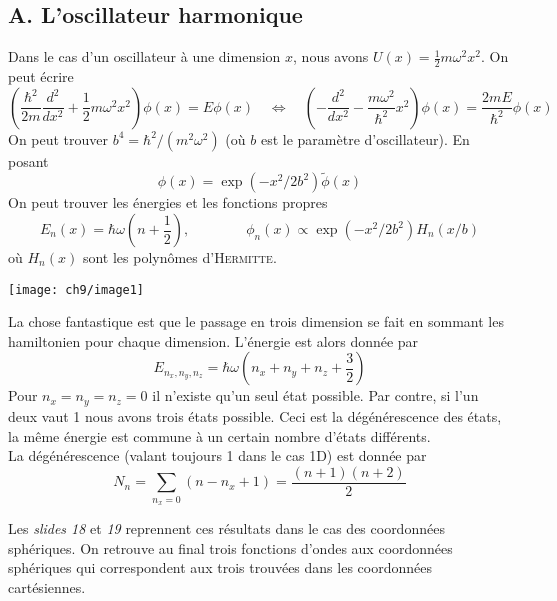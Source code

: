 \subsection{A. L'oscillateur harmonique}
Dans le cas d'un oscillateur à une dimension $x$, nous avons $U(x) = \frac{1}{2}m\omega^2x^2$. On peut écrire
\begin{equation}
\left(\frac{\hbar^2}{2m}\frac{d^2}{dx^2} + \frac{1}{2}m\omega^2x^2\right)\phi(x) = E\phi(x)\quad\Leftrightarrow
\quad \left(-\frac{d^2}{dx^2}-\frac{m\omega^2}{\hbar^2}x^2\right)\phi(x) = \frac{2mE}{\hbar^2}\phi(x)
\end{equation}
On peut trouver $b^4 = \hbar^2/(m^2\omega^2)$ (où $b$ est le paramètre d'oscillateur). En posant
\begin{equation}
\phi(x) = \exp(-x^2/2b^2)\tilde{\phi}(x)
\end{equation}
On peut trouver les énergies et les fonctions propres
\begin{equation}
E_n(x) = \hbar\omega\left(n+\frac{1}{2}\right),\qquad\qquad \phi_n(x) \propto \exp(-x^2/2b^2) H_n(x/b)
\end{equation}
où $H_n(x)$ sont les polynômes d'\textsc{Hermitte}.

\begin{center}
\texttt{[image: ch9/image1]}
\end{center}

La chose fantastique est que le passage en trois 
dimension se fait en sommant les hamiltonien pour chaque dimension. L'énergie est alors donnée par
\begin{equation}
E_{n_x,n_y,n_z} = \hbar\omega\left(n_x+n_y+n_z+\frac{3}{2}\right)
\end{equation}
Pour $n_x=n_y=n_z=0$ il n'existe qu'un seul état possible. Par contre, si l'un deux vaut 1 nous avons
trois états possible. Ceci est la dégénérescence des états, la même énergie est commune à un certain nombre
d'états différents.\\



La dégénérescence (valant toujours 1 dans le cas 1D) est donnée par
\begin{equation}
N_n = \sum_{n_x=0} (n-n_x+1) = \frac{(n+1)(n+2)}{2}
\end{equation}

Les \textit{slides 18} et \textit{19} reprennent ces résultats dans le cas des coordonnées sphériques. On retrouve
au final trois fonctions d'ondes aux coordonnées sphériques qui correspondent aux trois trouvées dans les
coordonnées cartésiennes.\\

